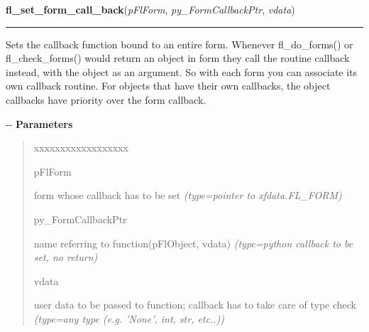     \label{xformslib:flbasic:fl_set_form_callback}

    \vspace{0.5ex}

\hspace{.8\funcindent}\begin{boxedminipage}{\funcwidth}

    \raggedright \textbf{fl\_set\_form\_call\_back}(\textit{pFlForm}, \textit{py\_FormCallbackPtr}, \textit{vdata})

    \vspace{-1.5ex}

    \rule{\textwidth}{0.5\fboxrule}
\setlength{\parskip}{2ex}

Sets the callback function bound to an entire form. Whenever
fl\_do\_forms() or fl\_check\_forms() would return an object in form they
call the routine callback instead, with the object as an argument. So
with each form you can associate its own callback routine. For objects
that have their own callbacks, the object callbacks have priority over
the form callback.

-{}-
\setlength{\parskip}{1ex}
      \textbf{Parameters}
      \vspace{-1ex}

      \begin{quote}
        \begin{Ventry}{xxxxxxxxxxxxxxxxxx}

          \item[pFlForm]


form whose callback has to be set
            {\it (type=pointer to xfdata.FL\_FORM)}

          \item[py\_FormCallbackPtr]


name referring to function(pFlObject, vdata)
            {\it (type=python callback to be set, no return)}

          \item[vdata]


user data to be passed to function; callback has to take care of
type check
            {\it (type=any type (e.g. 'None', int, str, etc..))}

        \end{Ventry}

      \end{quote}


\end{boxedminipage}
